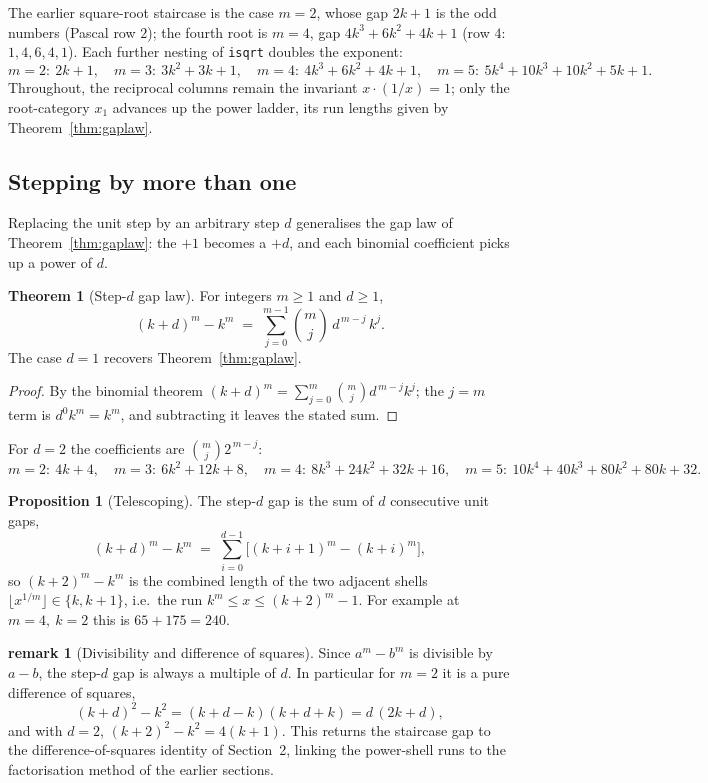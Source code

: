 \documentclass[11pt]{article}
\theoremstyle{definition}
\newtheorem{proposition}{Proposition}
\newtheorem{theorem}{Theorem}
\newtheorem{remark}{remark}
\begin{document}
\noindent The earlier square-root staircase is the case $m=2$, whose gap
$2k+1$ is the odd numbers (Pascal row $2$); the fourth root is $m=4$, gap
$4k^{3}+6k^{2}+4k+1$ (row $4$: $1,4,6,4,1$). Each further nesting of
\texttt{isqrt} doubles the exponent:
\[
  m=2:\ 2k+1,\quad
  m=3:\ 3k^{2}+3k+1,\quad
  m=4:\ 4k^{3}+6k^{2}+4k+1,\quad
  m=5:\ 5k^{4}+10k^{3}+10k^{2}+5k+1 .
\]
Throughout, the reciprocal columns remain the invariant $x\cdot(1/x)=1$; only the
root-category $x_{1}$ advances up the power ladder, its run lengths given by
Theorem~\ref{thm:gaplaw}.

\subsection{Stepping by more than one}

Replacing the unit step by an arbitrary step $d$ generalises the gap law of
Theorem~\ref{thm:gaplaw}: the $+1$ becomes a $+d$, and each binomial coefficient
picks up a power of $d$.

\begin{theorem}[Step-$d$ gap law]\label{thm:stepd}
For integers $m\ge 1$ and $d\ge 1$,
\[
  (k+d)^{m}-k^{m} \;=\; \sum_{j=0}^{m-1}\binom{m}{j}\,d^{\,m-j}\,k^{j}.
\]
The case $d=1$ recovers Theorem~\ref{thm:gaplaw}.
\end{theorem}

\begin{proof}
By the binomial theorem $(k+d)^{m}=\sum_{j=0}^{m}\binom{m}{j}d^{\,m-j}k^{j}$;
the $j=m$ term is $d^{0}k^{m}=k^{m}$, and subtracting it leaves the stated sum.
\end{proof}

For $d=2$ the coefficients are $\binom{m}{j}2^{\,m-j}$:
\[
  m=2:\ 4k+4,\quad
  m=3:\ 6k^{2}+12k+8,\quad
  m=4:\ 8k^{3}+24k^{2}+32k+16,\quad
  m=5:\ 10k^{4}+40k^{3}+80k^{2}+80k+32 .
\]

\begin{proposition}[Telescoping]
The step-$d$ gap is the sum of $d$ consecutive unit gaps,
\[
  (k+d)^{m}-k^{m} \;=\; \sum_{i=0}^{d-1}\bigl[(k+i+1)^{m}-(k+i)^{m}\bigr],
\]
so $(k+2)^{m}-k^{m}$ is the combined length of the two adjacent shells
$\lfloor x^{1/m}\rfloor\in\{k,k+1\}$, i.e.\ the run $k^{m}\le x\le(k+2)^{m}-1$.
For example at $m=4,\ k=2$ this is $65+175=240$.
\end{proposition}

\begin{remark}[Divisibility and difference of squares]
Since $a^{m}-b^{m}$ is divisible by $a-b$, the step-$d$ gap is always a multiple
of $d$. In particular for $m=2$ it is a pure difference of squares,
\[
  (k+d)^{2}-k^{2} = (k+d-k)(k+d+k) = d\,(2k+d),
\]
and with $d=2$, $(k+2)^{2}-k^{2}=4(k+1)$. This returns the staircase gap to the
difference-of-squares identity of Section~2, linking the power-shell runs to the
factorisation method of the earlier sections.
\end{remark}
\end{document}
